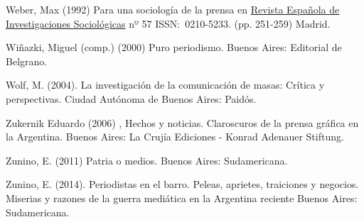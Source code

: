 Weber, Max (1992) Para una sociología de la prensa en \href{http://bddoc.csic.es:8080/ver/ISOC/revi/0034.html}{Revista Española de Investigaciones Sociológicas} nº 57 ISSN:~0210-5233. (pp. 251-259) Madrid.

Wiñazki, Miguel (comp.) (2000) Puro periodismo. Buenos Aires: Editorial de Belgrano.

Wolf, M. (2004). La investigación de la comunicación de masas: Crítica y perspectivas. Ciudad Autónoma de Buenos Aires: Paidós.

Zukernik Eduardo (2006) , Hechos y noticias. Claroscuros de la prensa gráfica en la Argentina. Buenos Aires: La Crujía Ediciones - Konrad Adenauer Stiftung.

Zunino, E. (2011) Patria o medios. Buenos Aires: Sudamericana.

Zunino, E. (2014). Periodistas en el barro. Peleas, aprietes, traiciones y negocios. Miserias y razones de la guerra mediática en la Argentina reciente Buenos Aires: Sudamericana.
\printbibliography

